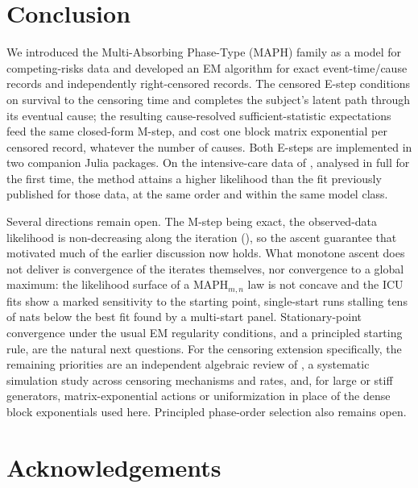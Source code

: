 \documentclass{article}
\newenvironment{rcrevision}{}{}
\newcommand{\subchg}[1]{#1}
\begin{document}
\section{Conclusion}
\label{sec:conclusion}

\begin{rcrevision}
We introduced the Multi-Absorbing Phase-Type (MAPH) family as a model for competing-risks data and developed \subchg{an} EM algorithm for exact event-time/cause records and independently right-censored records. The censored E-step conditions on survival to the censoring time and completes the subject's latent path through its eventual cause; the resulting cause-resolved sufficient-statistic expectations \subchg{feed the same closed-form M-step}, \subchg{and cost one block matrix exponential per censored record, whatever the number of causes.} Both E-steps are implemented in two companion Julia packages. On the intensive-care data of , analysed in full for the first time, the method attains a higher likelihood than the fit previously published for those data, at the same order and within the same model class.
\end{rcrevision}

\begin{rcrevision}
\subchg{Several directions remain open. The M-step being exact, the observed-data likelihood is non-decreasing along the iteration (\Cref{cor:monotone}), so the ascent guarantee that motivated much of the earlier discussion now holds. What monotone ascent does not deliver is convergence of the iterates themselves, nor convergence to a global maximum: the likelihood surface of a $\text{MAPH}_{m,n}$ law is not concave and the ICU fits show a marked sensitivity to the starting point, single-start runs stalling tens of nats below the best fit found by a multi-start panel. Stationary-point convergence under the usual EM regularity conditions, and a principled starting rule, are the natural next questions.} For the censoring extension specifically, the remaining priorities are an independent algebraic review of , a systematic simulation study across censoring mechanisms and rates, and, for large or stiff generators, matrix-exponential actions or uniformization in place of the dense block exponentials used here. \subchg{Principled phase-order selection also remains open.}
\end{rcrevision}

\section*{Acknowledgements}
\end{document}
